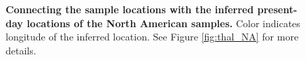 \documentclass[12pt]{article}
\begin{document}
\begin{figure}[!htb]
\begin{center}


\end{center}

\caption{
\textbf{Connecting the sample locations with the inferred present-day locations of the North American samples.}
Color indicates longitude of the inferred location.
See Figure \ref{fig:thal_NA} for more details.
}

\label{fig:thal_NA_connected}
\end{figure}


\end{document}

